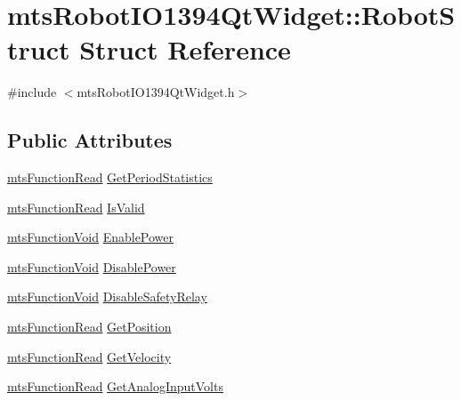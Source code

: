 \hypertarget{structmts_robot_i_o1394_qt_widget_1_1_robot_struct}{}\section{mts\+Robot\+I\+O1394\+Qt\+Widget\+:\+:Robot\+Struct Struct Reference}
\label{structmts_robot_i_o1394_qt_widget_1_1_robot_struct}


{\ttfamily \#include $<$mts\+Robot\+I\+O1394\+Qt\+Widget.\+h$>$}

\subsection*{Public Attributes}
\begin{DoxyCompactItemize}
\item 
\hyperlink{classmts_function_read}{mts\+Function\+Read} \hyperlink{structmts_robot_i_o1394_qt_widget_1_1_robot_struct_ac8c2cbe5059167223f44423db92f6290}{Get\+Period\+Statistics}
\item 
\hyperlink{classmts_function_read}{mts\+Function\+Read} \hyperlink{structmts_robot_i_o1394_qt_widget_1_1_robot_struct_ac277e603818049a49eb08f5e10a620cc}{Is\+Valid}
\item 
\hyperlink{classmts_function_void}{mts\+Function\+Void} \hyperlink{structmts_robot_i_o1394_qt_widget_1_1_robot_struct_aae3a95437e62a7b86be6380abad6def1}{Enable\+Power}
\item 
\hyperlink{classmts_function_void}{mts\+Function\+Void} \hyperlink{structmts_robot_i_o1394_qt_widget_1_1_robot_struct_a7adafb190e31ef50c5a022af76e889e9}{Disable\+Power}
\item 
\hyperlink{classmts_function_void}{mts\+Function\+Void} \hyperlink{structmts_robot_i_o1394_qt_widget_1_1_robot_struct_a17b0a2377710c0f323dd78cea94be030}{Disable\+Safety\+Relay}
\item 
\hyperlink{classmts_function_read}{mts\+Function\+Read} \hyperlink{structmts_robot_i_o1394_qt_widget_1_1_robot_struct_ab3a0e1cb41daa3529a120252fe4ea5c0}{Get\+Position}
\item 
\hyperlink{classmts_function_read}{mts\+Function\+Read} \hyperlink{structmts_robot_i_o1394_qt_widget_1_1_robot_struct_acc5aecde318ce18fe296558cae218253}{Get\+Velocity}
\item 
\hyperlink{classmts_function_read}{mts\+Function\+Read} \hyperlink{structmts_robot_i_o1394_qt_widget_1_1_robot_struct_a9bfa9bc30d77fa3a4236d1221e38b6a8}{Get\+Analog\+Input\+Volts}

\end{DoxyCompactItemize}
